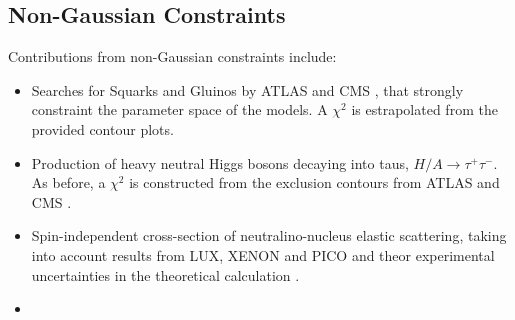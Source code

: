 \subsection{Non-Gaussian Constraints}
Contributions from non-Gaussian constraints include:
\begin{itemize}
\item Searches for Squarks and Gluinos by ATLAS and CMS , that strongly constraint the parameter space of the models. A $\chi^2$ is estrapolated from the provided contour plots. 
\item Production of heavy neutral Higgs bosons decaying into taus, $H/A \rightarrow \tau^+ \tau^-$. As before, a $\chi^2$ is constructed from the exclusion contours from ATLAS  and CMS  . 
\item Spin-independent cross-section of neutralino-nucleus elastic scattering, taking into account results from LUX, XENON and PICO  and theor experimental uncertainties in the theoretical calculation . 
\item {}
\end{itemize}
